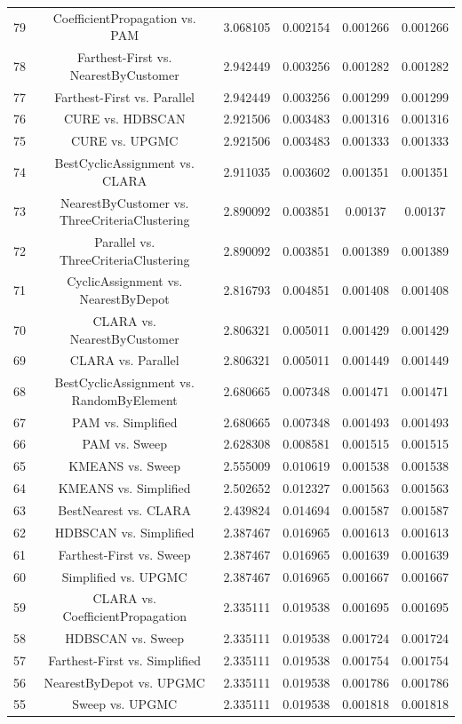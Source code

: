 \documentclass[a4paper,10pt]{article}
\begin{document}
\begin{landscape}
\begin{table}[!htp]
\begin{tabular}{cccccc}
79&CoefficientPropagation vs. PAM&3.068105&0.002154&0.001266&0.001266\\
78&Farthest-First vs. NearestByCustomer&2.942449&0.003256&0.001282&0.001282\\
77&Farthest-First vs. Parallel&2.942449&0.003256&0.001299&0.001299\\
76&CURE vs. HDBSCAN&2.921506&0.003483&0.001316&0.001316\\
75&CURE vs. UPGMC&2.921506&0.003483&0.001333&0.001333\\
74&BestCyclicAssignment vs. CLARA&2.911035&0.003602&0.001351&0.001351\\
73&NearestByCustomer vs. ThreeCriteriaClustering&2.890092&0.003851&0.00137&0.00137\\
72&Parallel vs. ThreeCriteriaClustering&2.890092&0.003851&0.001389&0.001389\\
71&CyclicAssignment vs. NearestByDepot&2.816793&0.004851&0.001408&0.001408\\
70&CLARA vs. NearestByCustomer&2.806321&0.005011&0.001429&0.001429\\
69&CLARA vs. Parallel&2.806321&0.005011&0.001449&0.001449\\
68&BestCyclicAssignment vs. RandomByElement&2.680665&0.007348&0.001471&0.001471\\
67&PAM vs. Simplified&2.680665&0.007348&0.001493&0.001493\\
66&PAM vs. Sweep&2.628308&0.008581&0.001515&0.001515\\
65&KMEANS vs. Sweep&2.555009&0.010619&0.001538&0.001538\\
64&KMEANS vs. Simplified&2.502652&0.012327&0.001563&0.001563\\
63&BestNearest vs. CLARA&2.439824&0.014694&0.001587&0.001587\\
62&HDBSCAN vs. Simplified&2.387467&0.016965&0.001613&0.001613\\
61&Farthest-First vs. Sweep&2.387467&0.016965&0.001639&0.001639\\
60&Simplified vs. UPGMC&2.387467&0.016965&0.001667&0.001667\\
59&CLARA vs. CoefficientPropagation&2.335111&0.019538&0.001695&0.001695\\
58&HDBSCAN vs. Sweep&2.335111&0.019538&0.001724&0.001724\\
57&Farthest-First vs. Simplified&2.335111&0.019538&0.001754&0.001754\\
56&NearestByDepot vs. UPGMC&2.335111&0.019538&0.001786&0.001786\\
55&Sweep vs. UPGMC&2.335111&0.019538&0.001818&0.001818\\

\end{tabular}
\end{table}
\end{landscape}
\end{document}
